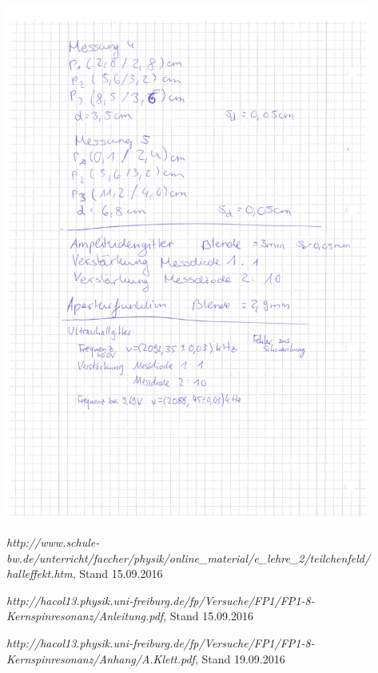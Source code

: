 \documentclass[12pt]{article}
\begin{document}
\begin{minipage}{\textwidth}
\centering
\includegraphics[width=0.9\textwidth]{figures/Laborbuch1.pdf}
\end{minipage}
\newpage
\listoffigures


\newpage
\thispagestyle{empty}
\begin{thebibliography}{9}

  

  
  
\emph{http://www.schule-bw.de/unterricht/faecher/physik/online\_material/e\_lehre\_2/teilchenfeld/\\halleffekt.htm}, Stand 15.09.2016

\emph{http://hacol13.physik.uni-freiburg.de/fp/Versuche/FP1/FP1-8-Kernspinresonanz/Anleitung.pdf}, Stand 15.09.2016

\emph{http://hacol13.physik.uni-freiburg.de/fp/Versuche/FP1/FP1-8-Kernspinresonanz/Anhang/A.Klett.pdf}, Stand 19.09.2016
\end{thebibliography}
\end{document}
